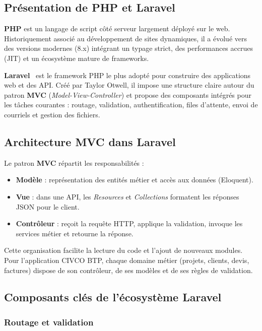 \subsection{Présentation de PHP et Laravel}

\textbf{PHP} est un langage de script côté serveur largement déployé sur le web.
Historiquement associé au développement de sites dynamiques, il a évolué vers des
versions modernes (8.x) intégrant un typage strict, des performances accrues (JIT) et
un écosystème mature de frameworks.

\medskip

\textbf{Laravel}~\cite{laravel} est le framework PHP le plus adopté pour construire des
applications web et des API. Créé par Taylor Otwell, il impose une structure claire
autour du patron \textbf{MVC} (\textit{Model-View-Controller}) et propose des
composants intégrés pour les tâches courantes : routage, validation, authentification,
files d'attente, envoi de courriels et gestion des fichiers.

\subsection{Architecture MVC dans Laravel}

Le patron \textbf{MVC} répartit les responsabilités :

\begin{itemize}
  \item \textbf{Modèle} : représentation des entités métier et accès aux données
  (Eloquent).
  \item \textbf{Vue} : dans une API, les \textit{Resources} et \textit{Collections}
  formatent les réponses JSON pour le client.
  \item \textbf{Contrôleur} : reçoit la requête HTTP, applique la validation, invoque
  les services métier et retourne la réponse.
\end{itemize}

Cette organisation facilite la lecture du code et l'ajout de nouveaux modules. Pour
l'application CIVCO BTP, chaque domaine métier (projets, clients, devis, factures)
dispose de son contrôleur, de ses modèles et de ses règles de validation.

\subsection{Composants clés de l'écosystème Laravel}

\subsubsection{Routage et validation}

